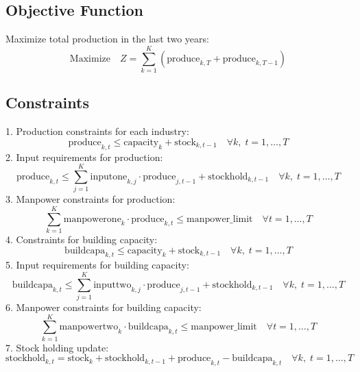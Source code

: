 \documentclass{article}
\begin{document}
\subsection*{Objective Function}
Maximize total production in the last two years:
\[
\text{Maximize} \quad Z = \sum_{k=1}^{K} \left( \text{produce}_{k, T} + \text{produce}_{k, T-1} \right)
\]

\subsection*{Constraints}
1. Production constraints for each industry:
\[
\text{produce}_{k,t} \leq \text{capacity}_{k} + \text{stock}_{k,t-1} \quad \forall k, \; t = 1, \ldots, T
\]
2. Input requirements for production:
\[
\text{produce}_{k,t} \leq \sum_{j=1}^{K} \text{inputone}_{k,j} \cdot \text{produce}_{j,t-1} + \text{stockhold}_{k,t-1} \quad \forall k, \; t = 1, \ldots, T
\]
3. Manpower constraints for production:
\[
\sum_{k=1}^{K} \text{manpowerone}_{k} \cdot \text{produce}_{k,t} \leq \text{manpower\_limit} \quad \forall t = 1, \ldots, T
\]
4. Constraints for building capacity:
\[
\text{buildcapa}_{k,t} \leq \text{capacity}_{k} + \text{stock}_{k,t-1} \quad \forall k, \; t = 1, \ldots, T
\]
5. Input requirements for building capacity:
\[
\text{buildcapa}_{k,t} \leq \sum_{j=1}^{K} \text{inputtwo}_{k,j} \cdot \text{produce}_{j,t-1} + \text{stockhold}_{k,t-1} \quad \forall k, \; t = 1, \ldots, T
\]
6. Manpower constraints for building capacity:
\[
\sum_{k=1}^{K} \text{manpowertwo}_{k} \cdot \text{buildcapa}_{k,t} \leq \text{manpower\_limit} \quad \forall t = 1, \ldots, T
\]
7. Stock holding update:
\[
\text{stockhold}_{k,t} = \text{stock}_{k} + \text{stockhold}_{k,t-1} + \text{produce}_{k,t} - \text{buildcapa}_{k,t} \quad \forall k, \; t = 1, \ldots, T
\]
\end{document}
